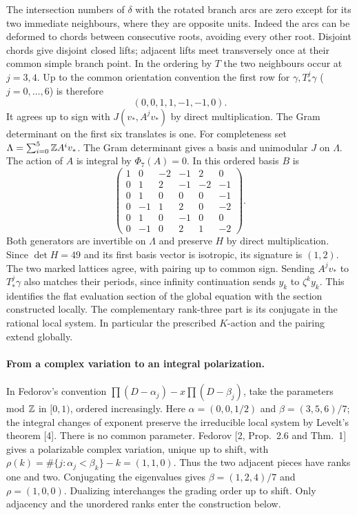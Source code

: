 \documentclass[10pt]{article}
\begin{document}
The intersection numbers of $\delta$ with the rotated branch arcs are zero except for its two immediate neighbours, where they are opposite units. Indeed the arcs can be deformed to chords between consecutive roots, avoiding every other root. Disjoint chords give disjoint closed lifts; adjacent lifts meet transversely once at their common simple branch point. In the ordering by $T$ the two neighbours occur at $j=3,4$. Up to the common orientation convention the first row for $\gamma,T_*^j\gamma$ ($j=0,\ldots,6$) is therefore
\[
                     (0,0,1,1,-1,-1,0).
\]
It agrees up to sign with $J(v_*,A^jv_*)$ by direct multiplication. The Gram determinant on the first six translates is one. For completeness set $\Lambda=\sum_{i=0}^5\mathbb Z A^iv_*$. The Gram determinant gives a basis and unimodular $J$ on $\Lambda$. The action of $A$ is integral by $\Phi_7(A)=0$. In this ordered basis $B$ is
\[
\begin{pmatrix}
1&0&-2&-1&2&0\\0&1&2&-1&-2&-1\\0&1&0&0&0&-1\\
0&-1&1&2&0&-2\\0&1&0&-1&0&0\\0&-1&0&2&1&-2
\end{pmatrix}.
\]
Both generators are invertible on $\Lambda$ and preserve $H$ by direct multiplication. Since $\det H=49$ and its first basis vector is isotropic, its signature is $(1,2)$. The two marked lattices agree, with pairing up to common sign. Sending $A^jv_*$ to $T_*^j\gamma$ also matches their periods, since infinity continuation sends $y_k$ to $\zeta^k y_k$. This identifies the flat evaluation section of the global equation with the section constructed locally. The complementary rank-three part is its conjugate in the rational local system. In particular the prescribed $K$-action and the pairing extend globally.

\paragraph{From a complex variation to an integral polarization.}
In Fedorov's convention $\prod(D-\alpha_j)-x\prod(D-\beta_j)$, take the parameters mod $\mathbb Z$ in $[0,1)$, ordered increasingly. Here $\alpha=(0,0,1/2)$ and $\beta=(3,5,6)/7$; the integral changes of exponent preserve the irreducible local system by Levelt's theorem [4]. There is no common parameter. Fedorov [2, Prop.~2.6 and Thm.~1] gives a polarizable complex variation, unique up to shift, with $\rho(k)=\#\{j:\alpha_j<\beta_k\}-k=(1,1,0)$. Thus the two adjacent pieces have ranks one and two. Conjugating the eigenvalues gives $\beta=(1,2,4)/7$ and $\rho=(1,0,0)$. Dualizing interchanges the grading order up to shift. Only adjacency and the unordered ranks enter the construction below.
\end{document}
